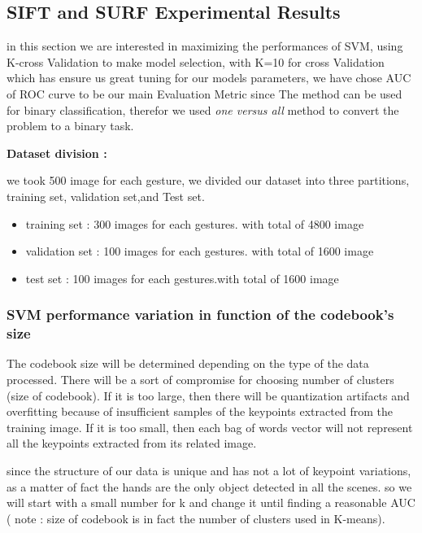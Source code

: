 \subsection{SIFT and SURF  Experimental Results}\label{resultssvm}
in this section we are interested in maximizing the performances of SVM, using K-cross Validation to make model selection, with  K=10 for cross Validation which has ensure us great tuning for our models parameters,
we have chose AUC of ROC curve  to be our main Evaluation Metric since The method can be used for binary classification, therefor we used \textit{one versus all} method to convert the problem to a binary task.

\textbf{Dataset division :}

we took 500 image for each gesture, we divided our dataset into three partitions, training set, validation set,and Test set.

\begin{itemize}
    \item training set :
         300 images for each gestures. with total of 4800 image
    \item validation set :
         100 images for each gestures. with total of 1600 image
    \item test set :
         100 images for each gestures.with total of 1600 image
\end{itemize}



\subsubsection{ SVM performance variation in function of the codebook's size }
The codebook size will be determined depending
on the type  of the data processed. There will be a sort of
compromise  for choosing number of clusters (size of codebook). If it is too large, then there will be quantization artifacts and overfitting because of insufficient samples of the keypoints extracted from the training image. If it is too small, then each bag of words vector will not represent all the keypoints extracted from its related image.

since the structure of our data is unique and has not a lot of keypoint variations, as a matter of fact the hands are the only object detected in all the scenes. so we will start with a  small number for k  and change it until finding a reasonable  AUC ( note : size of codebook is in fact the number of clusters used in K-means).


